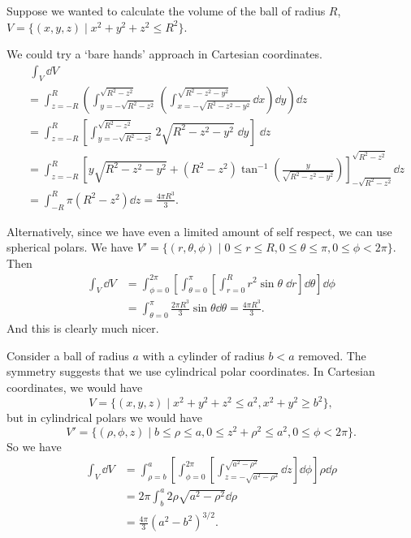 \begin{example}
	Suppose we wanted to calculate the volume of the ball of radius $R$, $V = \{(x, y, z) \mid x^2 + y^2 + z^2 \leq R^2\}$. 
	
	We could try a `bare hands' approach in Cartesian coordinates.
	\begin{align*}
		&\ \int_V \dd V\\ &= \int_{z=-R}^{R} \left(\int_{y = - \sqrt{R^2 - z^2}}^{\sqrt{R^2 - z^2}} \left( \int_{x = - \sqrt{R^2 - z^2 - y^2}}^{\sqrt{R^2 - z^2 - y^2}} \dd x\right)\dd y\right)\dd z \\
		&=\int_{z=-R}^{R}\left[\int_{y=-\sqrt{R^{2}-z^{2}}}^{\sqrt{R^{2}-z^{2}}} 2 \sqrt{R^{2}-z^{2}-y^{2}}\; \dd y\right] \;\dd z\\
		&= \int_{z = -R}^{R}\left[y \sqrt{R^2 - z^2 - y^2} + (R^2 - z^2)\tan^{-1}\left(\frac{y}{\sqrt{R^2 - z^2 - y^2}}\right)\right]_{-\sqrt{R^2 - z^2}}^{\sqrt{R^2 - z^2}} \dd z \\
		&= \int_{-R}^R \pi (R^2 - z^2) \dd z = \frac{4 \pi R^3}{3}.
	\end{align*}

	Alternatively, since we have even a limited amount of self respect, we can use spherical polars. We have $V' = \{(r, \theta, \phi) \mid 0 \leq r \leq R, 0 \leq \theta \leq \pi, 0 \leq \phi < 2\pi\}$. Then
	\begin{align*}
		\int_V \dd V &= \int_{\phi=0}^{2 \pi}\left[\int_{\theta=0}^{\pi}\left[\int_{r=0}^{R} r^{2} \sin \theta \; \dd r\right] \dd \theta\right] \dd \phi \\
		&= \int_{\theta=0}^{\pi} \frac{2 \pi R^{3}}{3} \sin \theta \dd\theta = \frac{4 \pi R^3}{3}.
	\end{align*}
	And this is clearly much nicer.
\end{example}

\begin{example}
	Consider a ball of radius $a$ with a cylinder of radius $b < a$ removed. The symmetry suggests that we use cylindrical polar coordinates. In Cartesian coordinates, we would have
	$$
	V = \{(x, y, z) \mid x^2 + y^2 + z^2 \leq a^2, x^2 + y^2 \geq b^2 \},
	$$
	but in cylindrical polars we would have
	$$
	V' = \{(\rho, \phi, z) \mid b \leq \rho \leq a, 0 \leq z^2 + \rho^2 \leq a^2, 0 \leq \phi < 2 \pi\}.
	$$
	So we have
	\begin{align*}
		\int_V \dd V &= \int_{\rho=b}^a \left[\int_{\phi = 0}^{2\pi}\left[\int_{z = -\sqrt{a^2 - \rho^2}}^{\sqrt{a^2 - \rho^2}}\dd z\right]\dd \phi\right]\rho \dd \rho \\
		&= 2 \pi \int_{b}^a 2\rho\sqrt{a^2 - \rho^2} \dd \rho \\
		&= \frac{4 \pi}{3}(a^2 - b^2)^{3/2}.
	\end{align*}
\end{example}

